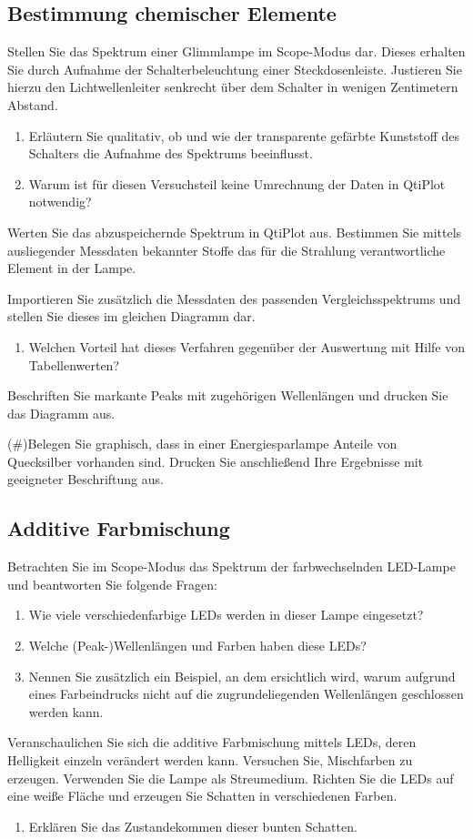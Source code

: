 \subsection{Bestimmung chemischer Elemente}
Stellen Sie das Spektrum einer Glimmlampe im Scope-Modus dar. Dieses erhalten Sie durch Aufnahme der Schalterbeleuchtung einer Steckdosenleiste. Justieren Sie hierzu den Lichtwellenleiter senkrecht über dem Schalter in wenigen Zentimetern Abstand.
\begin{enumerate}[label=$\blacktriangleright$]
	\item Erläutern Sie qualitativ, ob und wie der transparente gefärbte Kunststoff des Schalters die Aufnahme des Spektrums beeinflusst.
	\item Warum ist für diesen Versuchsteil keine Umrechnung der Daten in QtiPlot notwendig?
\end{enumerate}
Werten Sie das abzuspeichernde Spektrum in QtiPlot aus. Bestimmen Sie mittels ausliegender Messdaten bekannter Stoffe das für die Strahlung verantwortliche Element in der Lampe.

Importieren Sie zusätzlich die Messdaten des passenden Vergleichsspektrums und stellen Sie dieses im gleichen Diagramm dar.
\begin{enumerate}[label=$\blacktriangleright$]
	\item Welchen Vorteil hat dieses Verfahren gegenüber der Auswertung mit Hilfe von Tabellenwerten?
\end{enumerate}
Beschriften Sie markante Peaks mit zugehörigen Wellenlängen und drucken Sie das Diagramm aus.

(\#)Belegen Sie graphisch, dass in einer Energiesparlampe Anteile von Quecksilber vorhanden sind. Drucken Sie anschließend Ihre Ergebnisse mit geeigneter Beschriftung aus.
\subsection{Additive Farbmischung}
Betrachten Sie im Scope-Modus das Spektrum der farbwechselnden LED-Lampe und beantworten Sie folgende Fragen:
\begin{enumerate}[label=$\blacktriangleright$]
	\item Wie viele verschiedenfarbige LEDs werden in dieser Lampe eingesetzt?
	\item Welche (Peak-)Wellenlängen und Farben haben diese LEDs?
	\item Nennen Sie zusätzlich ein Beispiel, an dem ersichtlich wird, warum aufgrund eines Farbeindrucks nicht auf die zugrundeliegenden Wellenlängen geschlossen werden kann.
\end{enumerate}
Veranschaulichen Sie sich die additive Farbmischung mittels LEDs, deren Helligkeit einzeln verändert werden kann. Versuchen Sie, Mischfarben zu erzeugen. Verwenden Sie die Lampe als Streumedium. Richten Sie die LEDs auf eine weiße Fläche und erzeugen Sie Schatten in verschiedenen Farben.
\begin{enumerate}[label=$\blacktriangleright$]
	\item Erklären Sie das Zustandekommen dieser bunten Schatten.
\end{enumerate}